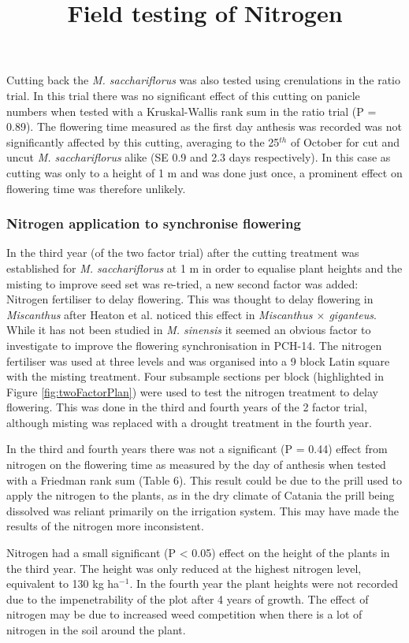 \documentclass[fleqn, 15pt, lineno]{olplainarticle}
\begin{document}
Cutting back the \textit{M. sacchariflorus} was also tested using crenulations in the ratio trial.
In this trial there was no significant effect of this cutting on panicle numbers when tested with a Kruskal-Wallis rank sum in the ratio trial (P = 0.89).
The flowering time measured as the first day anthesis was recorded was not significantly affected by this cutting, averaging to the 25$^{th}$ of October for cut and uncut \textit{M. sacchariflorus} alike (SE 0.9 and 2.3 days respectively).
In this case as cutting was only to a height of 1 m and was done just once, a prominent effect on flowering time was therefore unlikely.



\FloatBarrier
\subsubsection{Nitrogen application to synchronise flowering}
\title{Field testing of Nitrogen}

In the third year (of the two factor trial) after the cutting treatment was established for \textit{M. sacchariflorus} at 1 m in order to equalise plant heights and the misting to improve seed set was re-tried,  a new second factor was added: Nitrogen fertiliser to delay flowering.
This was thought to delay flowering in \textit{Miscanthus} after Heaton et al. \citep{HEATON2009} noticed this effect in \textit{Miscanthus $\times$ giganteus}.
While it has not been studied in \textit{M. sinensis} it seemed an obvious factor to investigate to improve the flowering synchronisation in PCH-14.
The nitrogen fertiliser was used at three levels and was organised into a 9 block Latin square with the misting treatment.
Four subsample sections per block (highlighted in Figure \ref{fig:twoFactorPlan}) were used to test the nitrogen treatment to delay flowering.
This was done in the third and fourth years of the 2 factor trial, although misting was replaced with a drought treatment in the fourth year.

In the third and fourth years there was not a significant (P = 0.44) effect from nitrogen on the flowering time as measured by the day of anthesis when tested with a Friedman rank sum (Table 6).
This result could be due to the prill used to apply the nitrogen to the plants, as in the dry climate of Catania the prill being dissolved was reliant primarily on the irrigation system.
This may have made the results of the nitrogen more inconsistent.

Nitrogen had a small significant (P < 0.05) effect on the height of the plants in the third year.
The height was only reduced at the highest nitrogen level, equivalent to 130 kg ha$^{-1}$.
In the fourth year the plant heights were not recorded due to the impenetrability of the plot after 4 years of growth.
The effect of nitrogen may be due to increased weed competition when there is a lot of nitrogen in the soil around the plant.
\end{document}
